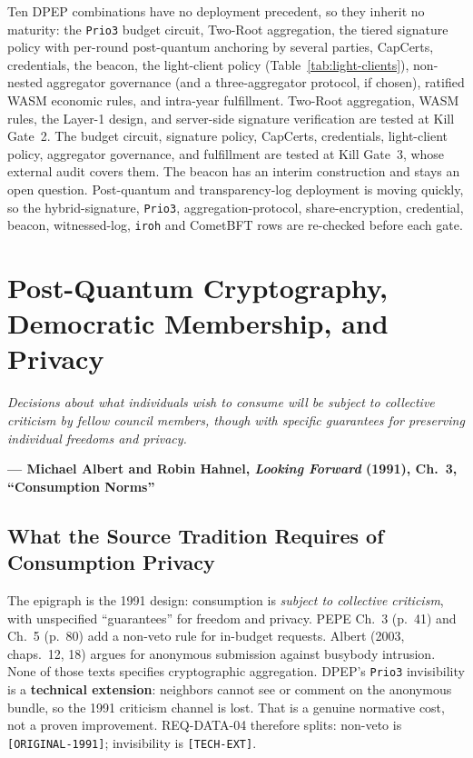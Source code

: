 \documentclass[10pt,twoside,openany]{book}
\theoremstyle{dpepstyle}
\newcommand{\chapterepigraph}[2]{%
  \vspace{-0.4em}
  \begin{FlushRight}
  \begin{minipage}{0.82\textwidth}
    \itshape\small\color{SlateDark} #1\par
    \vspace{3pt}
    \upshape\footnotesize\textbf{--- #2}
  \end{minipage}
  \end{FlushRight}
  \vspace{1em}
}
\newenvironment{FlushRight}{\begin{flushright}}{\end{flushright}}
\begin{document}
Ten DPEP combinations have no deployment precedent, so they inherit no maturity: the \texttt{Prio3} budget circuit, Two-Root aggregation, the tiered signature policy with per-round post-quantum anchoring by several parties, CapCerts, credentials, the beacon, the light-client policy (Table~\ref{tab:light-clients}), non-nested aggregator governance (and a three-aggregator protocol, if chosen), ratified WASM economic rules, and intra-year fulfillment. Two-Root aggregation, WASM rules, the Layer-1 design, and server-side signature verification are tested at Kill Gate~2. The budget circuit, signature policy, CapCerts, credentials, light-client policy, aggregator governance, and fulfillment are tested at Kill Gate~3, whose external audit covers them. The beacon has an interim construction and stays an open question. Post-quantum and transparency-log deployment is moving quickly, so the hybrid-signature, \texttt{Prio3}, aggregation-protocol, share-encryption, credential, beacon, witnessed-log, \texttt{iroh} and CometBFT rows are re-checked before each gate.

\chapter{Post-Quantum Cryptography, Democratic Membership, and Privacy}
\label{ch:crypto}

\chapterepigraph{Decisions about what individuals wish to consume will be subject to collective criticism by fellow council members, though with specific guarantees for preserving individual freedoms and privacy.}{Michael Albert and Robin Hahnel, \emph{Looking Forward} (1991), Ch.~3, ``Consumption Norms''\protect\footnotemark}

\section{What the Source Tradition Requires of Consumption Privacy}
\label{sec:consumption-privacy}
The epigraph is the 1991 design: consumption is \emph{subject to collective criticism}, with unspecified ``guarantees'' for freedom and privacy. PEPE Ch.~3 (p.~41) and Ch.~5 (p.~80) add a non-veto rule for in-budget requests. Albert (2003, chaps.~12, 18) argues for anonymous submission against busybody intrusion. None of those texts specifies cryptographic aggregation. DPEP's \texttt{Prio3} invisibility is a \textbf{technical extension}: neighbors cannot see or comment on the anonymous bundle, so the 1991 criticism channel is lost. That is a genuine normative cost, not a proven improvement. REQ-DATA-04 therefore splits: non-veto is \texttt{[ORIGINAL-1991]}; invisibility is \texttt{[TECH-EXT]}.
\end{document}
